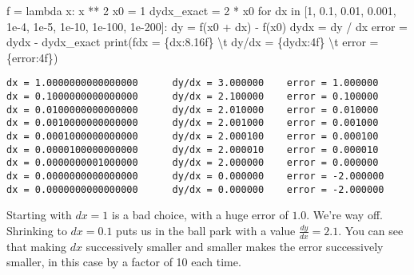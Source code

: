 \documentclass[
  letterpaper,
  DIV=11,
  numbers=noendperiod]{scrreprt}
\newenvironment{Shaded}{\begin{snugshade}}{\end{snugshade}}
\newcommand{\BuiltInTok}[1]{\textcolor[rgb]{0.00,0.23,0.31}{#1}}
\newcommand{\CharTok}[1]{\textcolor[rgb]{0.13,0.47,0.30}{#1}}
\newcommand{\ControlFlowTok}[1]{\textcolor[rgb]{0.00,0.23,0.31}{#1}}
\newcommand{\DecValTok}[1]{\textcolor[rgb]{0.68,0.00,0.00}{#1}}
\newcommand{\FloatTok}[1]{\textcolor[rgb]{0.68,0.00,0.00}{#1}}
\newcommand{\KeywordTok}[1]{\textcolor[rgb]{0.00,0.23,0.31}{#1}}
\newcommand{\NormalTok}[1]{\textcolor[rgb]{0.00,0.23,0.31}{#1}}
\newcommand{\OperatorTok}[1]{\textcolor[rgb]{0.37,0.37,0.37}{#1}}
\newcommand{\SpecialCharTok}[1]{\textcolor[rgb]{0.37,0.37,0.37}{#1}}
\newcommand{\SpecialStringTok}[1]{\textcolor[rgb]{0.13,0.47,0.30}{#1}}
\begin{document}
\begin{Shaded}
\begin{Highlighting}[]
\NormalTok{f }\OperatorTok{=} \KeywordTok{lambda}\NormalTok{ x: x }\OperatorTok{**} \DecValTok{2}
\NormalTok{x0 }\OperatorTok{=} \DecValTok{1}
\NormalTok{dydx\_exact }\OperatorTok{=} \DecValTok{2} \OperatorTok{*}\NormalTok{ x0}
\ControlFlowTok{for}\NormalTok{ dx }\KeywordTok{in}\NormalTok{ [}\DecValTok{1}\NormalTok{, }\FloatTok{0.1}\NormalTok{, }\FloatTok{0.01}\NormalTok{, }\FloatTok{0.001}\NormalTok{, }\FloatTok{1e{-}4}\NormalTok{, }\FloatTok{1e{-}5}\NormalTok{, }\FloatTok{1e{-}10}\NormalTok{, }\FloatTok{1e{-}100}\NormalTok{, }\FloatTok{1e{-}200}\NormalTok{]:}
\NormalTok{    dy }\OperatorTok{=}\NormalTok{ f(x0 }\OperatorTok{+}\NormalTok{ dx) }\OperatorTok{{-}}\NormalTok{ f(x0)}
\NormalTok{    dydx }\OperatorTok{=}\NormalTok{ dy }\OperatorTok{/}\NormalTok{ dx}
\NormalTok{    error }\OperatorTok{=}\NormalTok{ dydx }\OperatorTok{{-}}\NormalTok{ dydx\_exact}
    \BuiltInTok{print}\NormalTok{(}\SpecialStringTok{f\textquotesingle{}dx = }\SpecialCharTok{\{}\NormalTok{dx}\SpecialCharTok{:8.16f\}}\SpecialStringTok{ }\CharTok{\textbackslash{}t}\SpecialStringTok{ dy/dx = }\SpecialCharTok{\{}\NormalTok{dydx}\SpecialCharTok{:4f\}}\SpecialStringTok{ }\CharTok{\textbackslash{}t}\SpecialStringTok{ error = }\SpecialCharTok{\{}\NormalTok{error}\SpecialCharTok{:4f\}}\SpecialStringTok{\textquotesingle{}}\NormalTok{)}
\end{Highlighting}
\end{Shaded}

\begin{verbatim}
dx = 1.0000000000000000      dy/dx = 3.000000    error = 1.000000
dx = 0.1000000000000000      dy/dx = 2.100000    error = 0.100000
dx = 0.0100000000000000      dy/dx = 2.010000    error = 0.010000
dx = 0.0010000000000000      dy/dx = 2.001000    error = 0.001000
dx = 0.0001000000000000      dy/dx = 2.000100    error = 0.000100
dx = 0.0000100000000000      dy/dx = 2.000010    error = 0.000010
dx = 0.0000000001000000      dy/dx = 2.000000    error = 0.000000
dx = 0.0000000000000000      dy/dx = 0.000000    error = -2.000000
dx = 0.0000000000000000      dy/dx = 0.000000    error = -2.000000
\end{verbatim}

Starting with \(dx=1\) is a bad choice, with a huge error of \(1.0\).
We're way off. Shrinking to \(dx=0.1\) puts us in the ball park with a
value \(\frac{dy}{dx}=2.1\). You can see that making \(dx\) successively
smaller and smaller makes the error successively smaller, in this case
by a factor of 10 each time.
\end{document}
